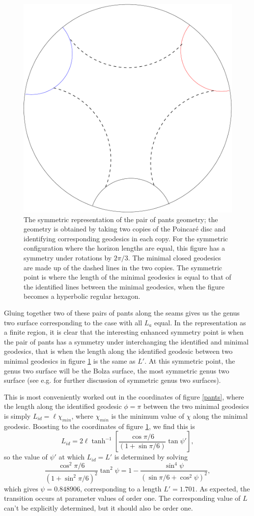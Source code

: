 \documentclass[12pt]{article}
\numberwithin{equation}{section}
\begin{document}
\begin{figure}
\centering
\includegraphics[keepaspectratio,width=0.4\linewidth]{symm.pdf}
\caption{The symmetric representation of the pair of pants geometry; the geometry is obtained by taking two copies of the Poincar\'e disc and identifying corresponding geodesics in each copy. For the symmetric configuration where the horizon lengths are equal, this figure has a symmetry under rotations by $2\pi/3$. The minimal closed geodesics are made up of the dashed lines in the two copies. The symmetric point is where the length of the minimal geodesics is equal to that of the identified lines between the minimal geodesics, when the figure becomes a hyperbolic regular hexagon.}
\label{symm}
\end{figure}


Gluing together two of these pairs of pants along the seams gives us the genus two surface corresponding to the case with all $L_a$ equal. In the representation as a finite region, it is clear that the interesting enhanced symmetry point is when the pair of pants has a symmetry under interchanging the identified and minimal geodesics, that is when the length along the identified geodesic between two minimal geodesics in figure \ref{symm} is the same as $L'$. At this symmetric point, the genus two surface will be the Bolza surface, the most symmetric genus two surface (see e.g. \cite{katz07} for further discussion of symmetric genus two surfaces).

This is most conveniently worked out in the coordinates of figure \ref{pants}, where the length along the identified geodesic $\phi = \pi$ between the two minimal geodesics is simply $L_{id} =  \ell \chi_{min}$, where $\chi_{min}$ is the minimum value of $\chi$ along the minimal geodesic. Boosting to the coordinates of figure \ref{symm}, we find this is
\begin{equation}
L_{id} =  2 \ell \tanh^{-1} \left[  \frac{\cos \pi/6}{(1 + \sin \pi/6)} \tan \psi' \right],
\end{equation}
so the value of $\psi'$ at which $L_{id} = L'$ is determined by solving
\begin{equation}
\frac{\cos^2 \pi/6}{(1+\sin^2 \pi/6)^2} \tan^2 \psi = 1- \frac{\sin^4 \psi}{(\sin \pi/6+ \cos^2 \psi)^2},
\end{equation}
which gives $\psi = 0.848906$, corresponding to a length $L' = 1.701$. As expected, the transition occurs at parameter values of order one. The corresponding value of $L$ can't be explicitly determined, but it should also be order one.
\end{document}
